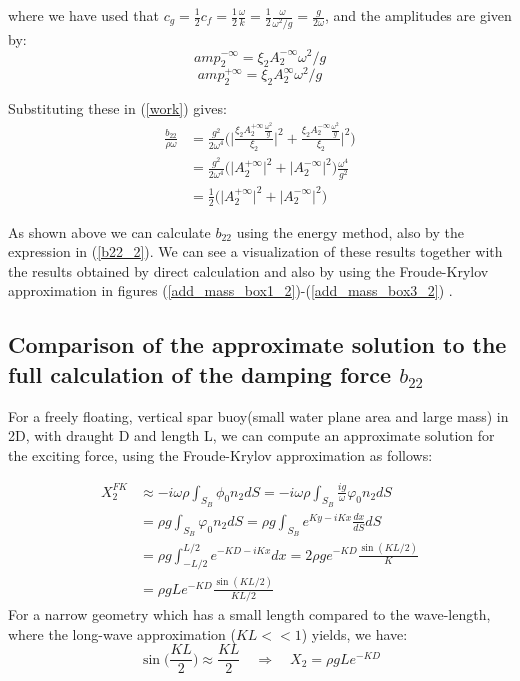 \documentclass[a4paper,10pt]{article}
\begin{document}
where we have used that $c_g = \frac{1}{2}c_f = \frac{1}{2} \frac{\omega}{k} = \frac{1}{2} \frac{\omega}{\omega^2 / g} = \frac{g}{2 \omega}$, and the amplitudes are given by:
$${amp}_2^{- \infty} = \xi_2 A_2^{-\infty} \omega^2 / g $$
$${amp}_2^{+ \infty} = \xi_2 A_2^{\infty} \omega^2 / g $$

Substituting these in (\ref{work}) gives:
\begin{align}
\frac{b_{22}}{\rho \omega} &= \frac{g^2}{2 \omega^4} \Bigg( \bigg\vert \frac{\xi_2 A_2^{+\infty} \frac{\omega^2}{g}}{\xi_2} \bigg\vert^2 + \frac{\xi_2 A_2^{-\infty} \frac{\omega^2}{g}}{\xi_2} \bigg\vert^2 \Bigg)\\
&= \frac{g^2}{2 \omega^4} \bigg( \big\vert A_2^{+ \infty} \big\vert^2 + \big\vert A_2^{- \infty} \big\vert^2 \bigg) \frac{\omega^4}{g^2}\\
&= \frac{1}{2} \Big( \big\vert A_2^{+ \infty} \big\vert^2 + \big\vert A_2^{- \infty} \big\vert^2 \Big) \label{b22_2}
\end{align}

As shown above we can calculate $b_{22}$ using the energy method, also by the expression in (\ref{b22_2}). We can see a visualization of these results together with the results obtained by direct calculation and also by using the Froude-Krylov approximation in figures (\ref{add_mass_box1_2})-(\ref{add_mass_box3_2}) .


\subsection{Comparison of the approximate solution to the full calculation of the damping force $b_{22}$}
For a freely floating, vertical spar buoy(small water plane area and large mass) in 2D, with draught D and length L, we can compute an approximate solution for the exciting force, using the Froude-Krylov approximation as follows:

\begin{align}
X_2^{FK} &\approx -i \omega \rho \int_{S_B} \phi_0 n_2 dS = -i \omega \rho \int_{S_B} \frac{i g}{\omega} \varphi_0 n_2 dS \nonumber\\[0.5 em]
&= \rho g \int_{S_B} \varphi_0 n_2 dS = \rho g \int_{S_B} e^{Ky - iKx}  \frac{dx}{dS} dS \nonumber\\[0.5 em]
&= \rho g \int_{-L/2}^{L/2} e^{-KD - iKx} dx = 2 \rho g e^{-KD}\frac{\sin(KL/2)}{K}\nonumber\\
&=\rho g L e^{-KD} \frac{\sin(KL/2)}{KL/2} \label{FK}
\end{align}
For a narrow geometry which has a small length compared to the wave-length, where the long-wave approximation ($KL<<1$) yields, we have:
\begin{equation}
\sin\Big(\frac{KL}{2}\Big) \approx \frac{KL}{2} \quad \Rightarrow \quad X_2 = \rho g L e^{-KD}
\end{equation}
\end{document}
